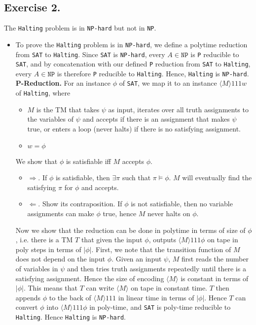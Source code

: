 \documentclass[12pt]{article}
\newcommand{\code}{\texttt}
\begin{document}
\subsection*{Exercise 2.} The \code{Halting} problem is in \code{NP-hard} but not in \code{NP}. 
\begin{itemize}
  \item To prove the \code{Halting} problem is in \code{NP-hard}, we define a polytime reduction from \code{SAT} to \code{Halting}. Since \code{SAT} is \code{NP-hard}, every \(A \in \code{NP}\) is \code{P} reducible to \code{SAT}, and by concatenation with our defined \code{P} reduction from \code{SAT} to \code{Halting}, every \(A \in \code{NP}\) is therefore \code{P} reducible to \code{Halting}. Hence, \code{Halting} is \code{NP-hard}.\\
  \textbf{P-Reduction.} For an instance \(\phi\) of \code{SAT}, we map it to an instance \(\langle M \rangle 111 w\) of \code{Halting}, where 
  \begin{itemize}
    \item \(M\) is the TM that takes \(\psi\) as input, iterates over all truth assignments to the variables of \(\psi\) and accepts if there is an assignment that makes \(\psi\) true, or enters a loop (never halts) if there is no satisfying assignment.
    \item \(w = \phi\)
  \end{itemize}
  We show that \(\phi\) is satisfiable iff \(M\) accepts \(\phi\).
  \begin{itemize}
    \item \(\Rightarrow\). If \(\phi\) is satisfiable, then \(\exists \pi\) such that \(\pi \models \phi\). \(M\) will eventually find the satisfying \(\pi\) for \(\phi\) and accepts.
    \item \(\Leftarrow\). Show its contraposition. If \(\phi\) is not satisfiable, then no variable assignments can make \(\phi\) true, hence \(M\) never halts on \(\phi\). 
  \end{itemize}
  Now we show that the reduction can be done in polytime in terms of size of \(\phi\), i.e. there is a TM \(T\) that given the input \(\phi\), outputs \(\langle M \rangle 111 \phi\) on tape in poly steps in terms of \(|\phi|\). First, we note that the transition function of \(M\) does not depend on the input \(\phi\). Given an input \(\psi\), \(M\) first reads the number of variables in \(\psi\) and then tries truth assignments repeatedly until there is a satisfying assignment. Hence the size of encoding \(\langle M \rangle\) is constant in terms of \(|\phi|\). This means that \(T\) can write \(\langle M \rangle\) on tape in constant time. \(T\) then appends \(\phi\) to the back of \(\langle M \rangle 111\) in linear time in terms of \(|\phi|\). Hence \(T\) can convert \(\phi\) into \(\langle M \rangle 111 \phi\) in poly-time, and \code{SAT} is poly-time reducible to \code{Halting}. Hence \code{Halting} is \code{NP-hard}.

\end{itemize}
\end{document}
